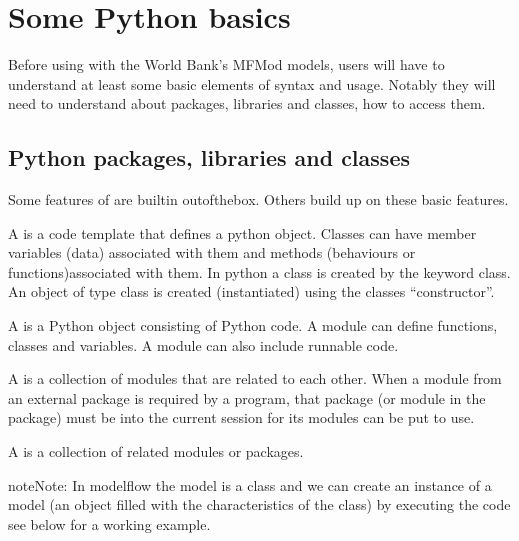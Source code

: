 \documentclass[letterpaper,10pt,english]{jupyterBook}
\begin{document}
\sphinxstepscope


\chapter{Some Python basics}
\label{\detokenize{content/04_PythonEssentials/PythonPackagesEtc:some-python-basics}}\label{\detokenize{content/04_PythonEssentials/PythonPackagesEtc::doc}}
\sphinxAtStartPar
Before using  with the World Bank’s MFMod models, users  will have to understand at least some basic elements of  syntax and usage.  Notably they will need to understand about packages, libraries and classes, how to access them.


\section{Python  packages, libraries and classes}
\label{\detokenize{content/04_PythonEssentials/PythonPackagesEtc:python-packages-libraries-and-classes}}
\sphinxAtStartPar
Some features of  are built\sphinxhyphen{}in out\sphinxhyphen{}of\sphinxhyphen{}the\sphinxhyphen{}box.  Others build up on these basic features.

\sphinxAtStartPar
A  is a code template that defines a python object. Classes can have member variables (data) associated with them and methods (behaviours or functions)associated with them. In python a class is created by the keyword class. An object of type class is created (instantiated) using the classes “constructor”.

\sphinxAtStartPar
A  is a Python object consisting of Python code. A module can define functions, classes and variables. A module can also include runnable code.

\sphinxAtStartPar
A  is a collection of modules that are related to each other. When a module from an external package is required by a program, that package (or module in the package) must  be  into the current session for its modules can be put to use.

\sphinxAtStartPar
A  is a collection of related modules or packages.

\begin{sphinxadmonition}{note}{Note:}
\sphinxAtStartPar
In modelflow the model is a class and we can create an instance of a model (an object filled with the characteristics of the class) by executing the code  see below for a working example.
\end{sphinxadmonition}
\end{document}
